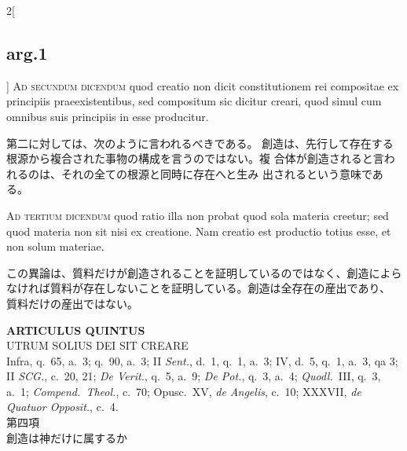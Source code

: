 \documentclass[paper=a4paper,fontsize=10pt,jafontsize=9pt,titlepage]{jlreq}
\begin{document}
\begin{paracol}{2}[\subsection{arg.1}]
{\scshape Ad secundum dicendum} quod creatio non dicit constitutionem
rei compositae ex principiis praeexistentibus, sed compositum sic
dicitur creari, quod simul cum omnibus suis principiis in esse
producitur.

\switchcolumn

第二に対しては、次のように言われるべきである。
創造は、先行して存在する根源から複合された事物の構成を言うのではない。複
 合体が創造されると言われるのは、それの全ての根源と同時に存在へと生み
 出されるという意味である。

\switchcolumn*[\subsection{ad.3}]

{\scshape Ad tertium dicendum} quod ratio illa non
probat quod sola materia creetur; sed quod materia non sit nisi ex
creatione. Nam creatio est productio totius esse, et non solum materiae.

\switchcolumn

この異論は、質料だけが創造されることを証明しているのではなく、創造によら
 なければ質料が存在しないことを証明している。創造は全存在の産出であり、
 質料だけの産出ではない。

\end{paracol}
\newpage
{}
{}
\setcounter{section}{5}
\setcounter{subsection}{0}






\begin{center}
 {\Large {\bfseries ARTICULUS QUINTUS}}\\
 {\large UTRUM SOLIUS DEI SIT CREARE}\\
 {\footnotesize Infra, q.~65, a.~3; q.~90, a.~3; II {\itshape Sent.},
 d.~1, q.~1, a.~3; IV, d.~5, q.~1, a.~3, qa 3; II {\itshape SCG.},
 c.~20, 21; {\itshape De Verit.}, q.~5, a.~9; {\itshape De Pot.}, q.~3,
 a.~4; {\itshape Quodl.}~III, q.~3, a.~1; {\itshape Compend.~Theol.},
 c.~70; Opusc.~XV, {\itshape de Angelis}, c.~10; XXXVII, {\itshape de
 Quatuor Opposit.}, c.~4.}\\
 {\Large 第四項\\創造は神だけに属するか}
\end{center}
\end{document}
